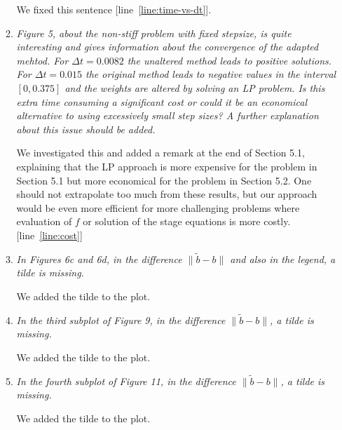 \documentclass[11pt]{letter}
\begin{document}
\begin{letter}{}
\begin{enumerate}[label=\arabic*.]
\begin{enumerate}[label=\alph*)]
    We fixed this sentence [line~\ref{line:time-vs-dt}].


    \item \emph{%
    Figure 5, about the non-stiff problem with fixed stepsize, is quite interesting
    and gives information about the convergence of the adapted mehtod. For
    $\Delta t = 0.0082$ the unaltered method leads to positive solutions. For
    $\Delta t = 0.015$ the original method leads to negative values in the
    interval $[0, 0.375]$ and the weights are altered by solving an LP problem.
    Is this extra time consuming a significant cost or could it be an economical
    alternative to using excessively small step sizes? A further explanation
    about this issue should be added.
    }

    We investigated this and added a remark at the end of Section 5.1, explaining
    that the LP approach is more expensive for the problem in Section 5.1 but more
    economical for the problem in Section 5.2.  One should not extrapolate too
    much from these results, but our approach would be even
    more efficient for more challenging problems where evaluation of $f$ or
    solution of the stage equations is more costly.  [line~\ref{line:cost}]


    \item \emph{%
    In Figures 6c and 6d, in the difference $\| \tilde b - b \|$ and also in the
    legend, a tilde is missing.
    }

    We added the tilde to the plot.


    \item \emph{%
    In the third subplot of Figure 9, in the difference $\| \tilde b - b \|$,
    a tilde is missing.
    }

    We added the tilde to the plot.


    \item \emph{%
    In the fourth subplot of Figure 11, in the difference $\| \tilde b - b \|$,
    a tilde is missing.
    }

    We added the tilde to the plot.
  \end{enumerate}
\end{enumerate}








\end{letter}
\end{document}
